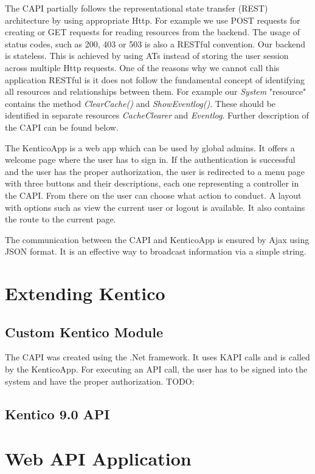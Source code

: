 The CAPI partially follows the representational state transfer (REST) architecture by using appropriate Http. For example we use POST requests for creating or GET requests for reading resources from the backend. The usage of status codes, such as 200, 403 or 503 is also a RESTful convention. Our backend is stateless. This is achieved by using ATs instead of storing the user session across multiple Http requests. One of the reasons why we cannot call this application RESTful is it does not follow the fundamental concept of identifying all resources and relationships between them. For example our \textit{System} "resource" contains the method \textit{ClearCache()} and \textit{ShowEventlog()}. These should be identified in separate resources \textit{CacheClearer} and \textit{Eventlog}. Further description of the CAPI can be found below.

The KenticoApp is a web app which can be used by global admins. It offers a welcome page where the user has to sign in. If the authentication is successful and the user has the proper authorization, the user is redirected to a menu page with three buttons and their descriptions, each one representing a controller in the CAPI. From there on the user can choose what action to conduct. A layout with options such as view the current user or logout is available. It also contains the route to the current page. 

The communication between the CAPI and KenticoApp is ensured by Ajax using JSON format. It is an effective way to broadcast information via a simple string.

\section{Extending Kentico} \label{implExtendingKentico}
\subsection{Custom Kentico Module}
The CAPI was created using the .Net framework. It uses KAPI calls and is called by the KenticoApp. For executing an API call, the user has to be signed into the system and have the proper authorization. 
TODO: 

\subsection{Kentico 9.0 API}

\section{Web API Application}
